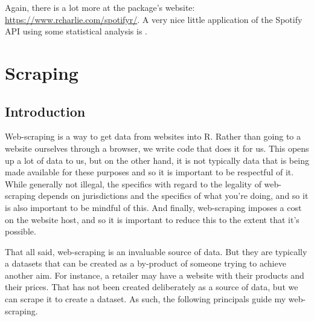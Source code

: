 \documentclass[
]{book}
\begin{document}
Again, there is a lot more at the package's website: \url{https://www.rcharlie.com/spotifyr/}. A very nice little application of the Spotify API using some statistical analysis is \citet{kaylinpavlik}.

\hypertarget{scraping}{%
\section{Scraping}\label{scraping}}

\hypertarget{introduction-8}{%
\subsection{Introduction}\label{introduction-8}}

Web-scraping is a way to get data from websites into R. Rather than going to a website ourselves through a browser, we write code that does it for us. This opens up a lot of data to us, but on the other hand, it is not typically data that is being made available for these purposes and so it is important to be respectful of it. While generally not illegal, the specifics with regard to the legality of web-scraping depends on jurisdictions and the specifics of what you're doing, and so it is also important to be mindful of this. And finally, web-scraping imposes a cost on the website host, and so it is important to reduce this to the extent that it's possible.

That all said, web-scraping is an invaluable source of data. But they are typically a datasets that can be created as a by-product of someone trying to achieve another aim. For instance, a retailer may have a website with their products and their prices. That has not been created deliberately as a source of data, but we can scrape it to create a dataset. As such, the following principals guide my web-scraping.
\end{document}
